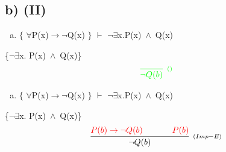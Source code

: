 \documentclass[aspectratio=43]{beamer}
\newcommand{\ria}{$\rightarrow$}
\newcommand{\fall}{$\forall$}
\newcommand{\ex}{$\exists$}
\newcommand{\nao}{$\neg$}
\newcommand{\nex}{\nao\ex}
\newcommand{\andd}{$\wedge$}
\begin{document}
    \subsection{b) (II)}
    
    \begin{frame}[fragile]
    	
    	\begin{enumerate}[b)]
			
			\item $\{$ \fall P(x)\ria \nao Q(x) $\}$ $\vdash$ \nex  x.P(x)\ \andd\ Q(x) \\ 
			
		\end{enumerate}
        \{\nex  x. P(x)\ \andd\ Q(x)\}
        \vspace{100pt}
        \[
        \begin{array}{c}
		
        	\textcolor{green}{
            \infer[_{()}]
            {$\nao$ Q(b)}
            {}
            }
		\end{array}
        \]
        
	\end{frame}
    
    \begin{frame}[fragile]
    	
    	\begin{enumerate}[b)]
			
			\item $\{$ \fall P(x)\ria \nao Q(x) $\}$ $\vdash$ \nex x.P(x)\ \andd\ Q(x) \\ 
			
		\end{enumerate}
        \{\nex  x. P(x)\ \andd\ Q(x)\}
        \vspace{95pt}
        \[
        \begin{array}{c}
		
        	\infer[_{(Imp-E)}]
            {$\nao$ Q(b)}
            {\textcolor{red}{
            P(b) \rightarrow \neg Q(b) 
            \hspace{35pt}
            P(b)
            }
            }
		\end{array}
        \]
        
	\end{frame}
    
\end{document}
